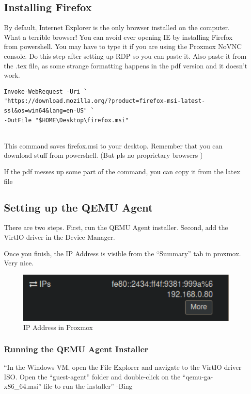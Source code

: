 \documentclass{article}
\begin{document}
\subsection{Installing Firefox}
By default, Internet Explorer is the only browser installed on the computer. What a terrible browser! You can avoid ever opening IE by installing Firefox from powershell. 
You may have to type it if you are using the Proxmox NoVNC console. Do this step after setting up RDP so you can paste it. Also paste it from the .tex file, as some strange formatting happens
in the pdf version and it doesn't work.

\begin{lstlisting}[breaklines=true, columns=fullflexible]
Invoke-WebRequest -Uri `
"https://download.mozilla.org/?product=firefox-msi-latest-ssl&os=win64&lang=en-US" `
-OutFile "$HOME\Desktop\firefox.msi"
       
\end{lstlisting}
        

\noindent This command saves firefox.msi to your desktop. Remember that you can download stuff from powershell. (But pls no proprietary browsers \Vomey{})

\noindent If the pdf messes up some part of the command, you can copy it from the latex file

\subsection{Setting up the QEMU Agent}
There are two steps. First, run the QEMU Agent installer. Second, add the VirtIO driver in the Device Manager.

Once you finish, the IP Address is visible from the “Summary” tab in proxmox. Very nice.

\begin{figure}[H]
    \centering
    \includegraphics[width=1\textwidth]{successfulAgentIPThingie.png}
    \caption{IP Address in Proxmox}
    \label{fig:successfulAgentIPThingie}
\end{figure}

\subsubsection{Running the QEMU Agent Installer}
“In the Windows VM, open the File Explorer and navigate to the VirtIO driver ISO. Open the “guest-agent” folder and double-click on the “qemu-ga-x86\_64.msi” file to run the installer” -Bing
\end{document}

